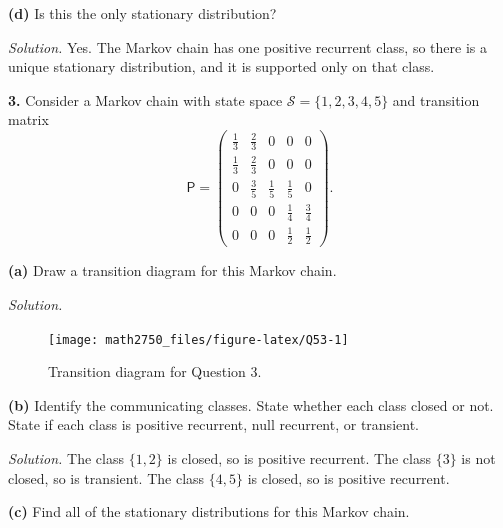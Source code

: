 \documentclass[
  a4paper,
]{article}
\theoremstyle{definition}
\theoremstyle{definition}
\theoremstyle{definition}
\theoremstyle{remark}
\begin{document}
\textbf{(d)} Is this the only stationary distribution?

\begin{myanswers}
\emph{Solution.} Yes. The Markov chain has one positive recurrent class, so there is a unique stationary distribution, and it is supported only on that class.

\end{myanswers}

\textbf{3.} Consider a Markov chain with state space \(\mathcal S = \{1,2,3,4,5\}\) and transition matrix
\[  \mathsf P = \begin{pmatrix} \frac13 & \frac23 & 0 &0 & 0 \\
                   \frac13 & \frac23 & 0 &0 & 0 \\
                   0 &\frac35 & \frac15 & \frac15 & 0 \\
                   0 & 0 & 0 & \frac14 &\frac34 \\
                   0 & 0 & 0 & \frac12 & \frac12 \end{pmatrix} . \]

\textbf{(a)} Draw a transition diagram for this Markov chain.

\begin{myanswers}

\emph{Solution.}

\begin{figure}

{\centering \texttt{[image: math2750\_files/figure-latex/Q53-1]} 

}

\caption{Transition diagram for Question 3.}\label{fig:Q53}
\end{figure}

\end{myanswers}

\textbf{(b)} Identify the communicating classes. State whether each class closed or not. State if each class is positive recurrent, null recurrent, or transient.

\begin{myanswers}
\emph{Solution.} The class \(\{1,2\}\) is closed, so is positive recurrent. The class \(\{3\}\) is not closed, so is transient. The class \(\{4,5\}\) is closed, so is positive recurrent.

\end{myanswers}

\textbf{(c)} Find all of the stationary distributions for this Markov chain.
\end{document}

